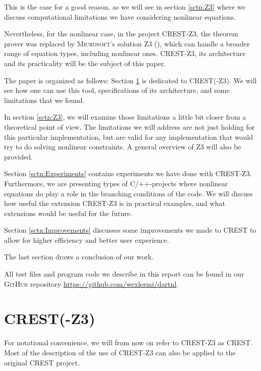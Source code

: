 \documentclass[oribibl, twocolumn]{llncs}
\begin{document}
This is the case for a good reason, as we will see in section \ref{sctn:Z3} where we discuss computational limitations we have considering nonlinear equations.

Nevertheless, for the nonlinear case, in the project \textsc{CREST-Z3}, the theorem prover was replaced
by \textsc{Microsoft'}s solution \textsc{Z3}
(\cite{de2008z3}), which can handle a broader range of equation types,
including nonlinear ones. \textsc{CREST-Z3}, its architecture and
its practicality will be the subject of this paper.

The paper is organized as follows: Section \ref{sctn:CRESTZ3} is
dedicated to \textsc{CREST}(-\textsc{Z3}). We will see how one can use
this tool, specifications of its architecture, and some limitations
that we found.

In section \ref{sctn:Z3}, we will examine those limitations a little
bit closer from a theoretical point of view. The limitations we will address are not just holding for this particular implementation, but are valid for any implementation that would try to do solving nonlinear constraints. A general overview of
\textsc{Z3} will also be provided.

Section \ref{sctn:Experiments} contains experiments we have done with
\textsc{CREST-Z3}. Furthermore, we are presenting types of \textsc{C/++}-projects
where nonlinear equations do play a role in the branching conditions
of the code. We will discuss how useful the extension \textsc{CREST-Z3} is in practical examples, and what extensions would be useful for the future.

Section \ref{sctn:Improvements} discusses some improvements we made to CREST to allow for higher efficiency
and better user experience.

The last section draws a conclusion of our work.

All test files and program code we describe in this report can be found in our \textsc{GitHub} repository \url{https://github.com/wexlermi/dartnl}.


\section{\textsc{CREST}(-\textsc{Z3})}
\label{sctn:CRESTZ3}

For notational convenience, we will from now on refer to
\textsc{CREST-Z3} as \textsc{CREST}. Most of the description of the
use of \textsc{CREST-Z3} can also be applied to the original
\textsc{CREST} project.
\end{document}
